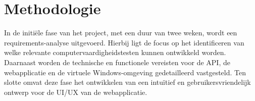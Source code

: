 \section{Methodologie}%
\label{sec:methodologie}







In de initiële fase van het project, met een duur van twee weken, wordt een requirements-analyse uitgevoerd. Hierbij ligt de focus op het identificeren van welke relevante computervaardigheidstesten kunnen ontwikkeld worden.
Daarnaast worden de technische en functionele vereisten voor de API, de webapplicatie en de virtuele Windows-omgeving gedetailleerd vastgesteld. Ten slotte omvat deze fase het ontwikkelen van een intuïtief en gebruikersvriendelijk ontwerp voor de UI/UX van de webapplicatie.

